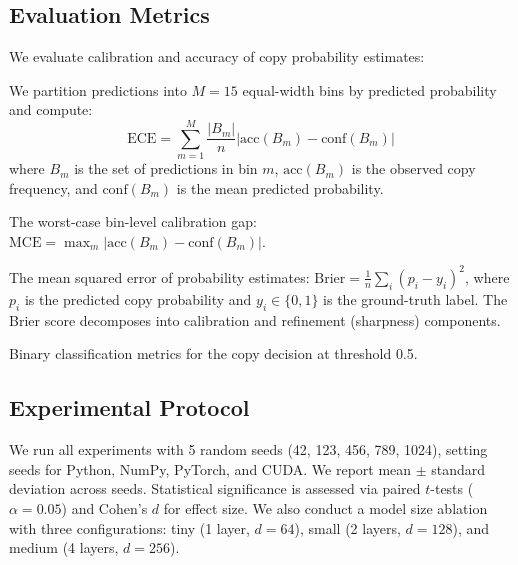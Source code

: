 \subsection{Evaluation Metrics}
\label{sec:metrics}

We evaluate calibration and accuracy of copy probability estimates:

 We partition predictions into $M = 15$ equal-width bins by predicted probability and compute:
\begin{equation}
    \text{ECE} = \sum_{m=1}^{M} \frac{|B_m|}{n} \left| \text{acc}(B_m) - \text{conf}(B_m) \right|
    \label{eq:ece}
\end{equation}
where $B_m$ is the set of predictions in bin $m$, $\text{acc}(B_m)$ is the observed copy frequency, and $\text{conf}(B_m)$ is the mean predicted probability.

 The worst-case bin-level calibration gap: $\text{MCE} = \max_m \left| \text{acc}(B_m) - \text{conf}(B_m) \right|$.

 The mean squared error of probability estimates: $\text{Brier} = \frac{1}{n} \sum_i (p_i - y_i)^2$, where $p_i$ is the predicted copy probability and $y_i \in \{0, 1\}$ is the ground-truth label. The Brier score decomposes into calibration and refinement (sharpness) components.

 Binary classification metrics for the copy decision at threshold 0.5.

\subsection{Experimental Protocol}
\label{sec:protocol}

We run all experiments with 5 random seeds (42, 123, 456, 789, 1024), setting seeds for Python, NumPy, PyTorch, and CUDA. We report mean $\pm$ standard deviation across seeds. Statistical significance is assessed via paired $t$-tests ($\alpha = 0.05$) and Cohen's $d$ for effect size. We also conduct a model size ablation with three configurations: tiny (1 layer, $d = 64$), small (2 layers, $d = 128$), and medium (4 layers, $d = 256$).